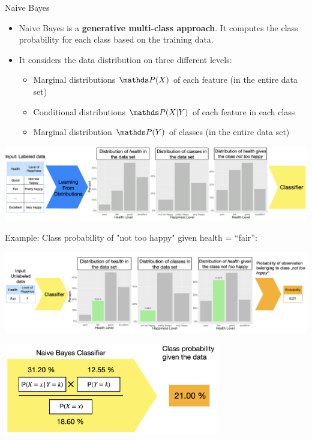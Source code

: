\documentclass[11pt,compress,t,notes=noshow, xcolor=table]{beamer}
\begin{document}

\begin{vbframe}{Naive Bayes}
\begin{itemize}
\item \small Naive Bayes is a \textbf{generative multi-class approach}. It computes the class probability for each class based on the training data.
\item \small It considers the data distribution on three different levels:
    \begin{itemize}
    \item \small Marginal distributions $\P(X)$ of each feature (in the entire data set)
    \item \small Conditional distributions $\P(X|Y)$ of each feature in each class
    \item \small Marginal distribution $\P(Y)$ of classes (in the entire data set)
    \end{itemize}
\vspace*{1cm}
\end{itemize}
\begin{center}
  \includegraphics[width=1\textwidth]{slides/supervised-classification/figure_man/nutshell-classif-distributions_learning.png}
\end{center}

\newpage
\item \small Example: Class probability of "not too happy" given health = ``fair'':
\begin{center}
  \includegraphics[width=1\textwidth]{slides/supervised-classification/figure_man/nutshell-classif-distributions-prediction.png}
\end{center}
\begin{center}
  \includegraphics[width=0.7\textwidth]{slides/supervised-classification/figure_man/nutshell-classif-naive-bayes-formula.png}
\end{center}






\end{vbframe}
\end{document}
